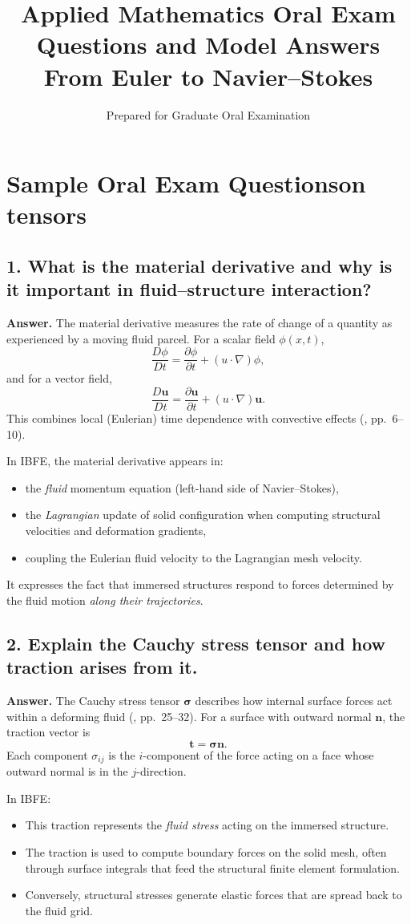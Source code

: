 \documentclass[12pt]{article}
\title{\vspace{-2em}\textbf{Applied Mathematics Oral Exam Questions and Model Answers}\\
\large From Euler to Navier--Stokes}
\author{Prepared for Graduate Oral Examination}
\date{}
\begin{document}
\section*{Sample Oral Exam Questionson tensors}

\subsection*{1. What is the material derivative and why is it important in fluid–structure interaction?}

\textbf{Answer.}
The material derivative measures the rate of change of a quantity as experienced
by a moving fluid parcel. For a scalar field $\phi(x,t)$,
\[
\frac{D\phi}{Dt}
= \frac{\partial \phi}{\partial t} + (u\cdot\nabla)\phi,
\]
and for a vector field,
\[
\frac{D\mathbf{u}}{Dt}
= \frac{\partial \mathbf{u}}{\partial t} + (u\cdot\nabla) \mathbf{u}.
\]
This combines local (Eulerian) time dependence with convective effects
(\cite{file:turn4file0}, pp.\ 6–10).

In IBFE, the material derivative appears in:
\begin{itemize}
    \item the \emph{fluid} momentum equation (left-hand side of Navier--Stokes),
    \item the \emph{Lagrangian} update of solid configuration when computing 
          structural velocities and deformation gradients,
    \item coupling the Eulerian fluid velocity to the Lagrangian mesh velocity.
\end{itemize}

It expresses the fact that immersed structures respond to forces determined by
the fluid motion \emph{along their trajectories}.

\subsection*{2. Explain the Cauchy stress tensor and how traction arises from it.}

\textbf{Answer.}
The Cauchy stress tensor $\boldsymbol{\sigma}$ describes how internal surface
forces act within a deforming fluid (\cite{file:turn4file0}, pp.\ 25–32).
For a surface with outward normal $\mathbf{n}$, the traction vector is
\[
\mathbf{t} = \boldsymbol{\sigma}\mathbf{n}.
\]
Each component $\sigma_{ij}$ is the $i$-component of the force acting on a face
whose outward normal is in the $j$-direction.

In IBFE:
\begin{itemize}
    \item This traction represents the \emph{fluid stress} acting on the
          immersed structure.
    \item The traction is used to compute boundary forces on the solid mesh,
          often through surface integrals that feed the structural finite element
          formulation.
    \item Conversely, structural stresses generate elastic forces that are
          spread back to the fluid grid.
\end{itemize}
\end{document}
